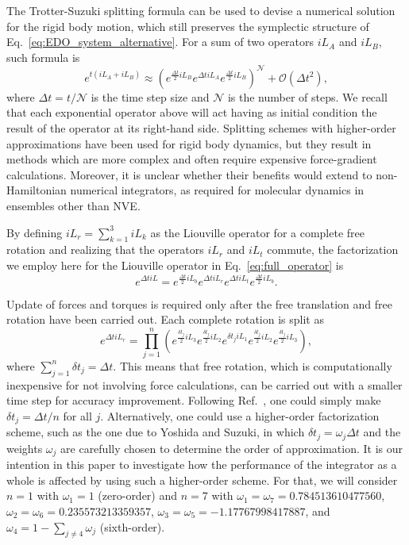 \documentclass[aip,jcp,reprint,amsmath,amssymb,raggedbottom]{revtex4-1}
\begin{document}
The Trotter-Suzuki splitting formula\cite{Trotter1959, Suzuki1976} can be used to devise a numerical solution for the rigid body motion, which still preserves the symplectic structure of Eq.~\ref{eq:EDO_system_alternative}. For a sum of two operators $i\!L_A$ and $i\!L_B$, such formula is
\[
e^{t(i\!L_A + i\!L_B)} \approx \left( e^{\frac{\Delta t}{2} i\!L_B} e^{\Delta t i\!L_A} e^{\frac{\Delta t}{2} i\!L_B} \right)^\mathcal{N} + \mathcal{O}(\Delta t^2),
\]
where $\Delta t = t/\mathcal N$ is the time step size and $\mathcal N$ is the number of steps. We recall that each exponential operator above will act having as initial condition the result of the operator at its right-hand side. Splitting schemes with higher-order approximations have been used for rigid body dynamics,\cite{Omelyan2007, Omelyan2008, vanZon2008} but they result in methods which are more complex and often require expensive force-gradient calculations. Moreover, it is unclear whether their benefits would extend to non-Hamiltonian numerical integrators, as required for molecular dynamics in ensembles other than NVE.

By defining $i\!L_r = \sum_{k=1}^3 i\!L_k$ as the Liouville operator for a complete free rotation and realizing that the operators $i\!L_r$ and $i\!L_t$ commute, the factorization we employ here for the Liouville operator in Eq.~\ref{eq:full_operator} is
\begin{equation}
\label{eq:trotter_splitting_NVE}
e^{\Delta t i\!L} = e^{\frac{\Delta t}{2} i\!L_b} e^{\Delta t i\!L_r} e^{\Delta t i\!L_t} e^{\frac{\Delta t}{2} i\!L_b}.
\end{equation}

Update of forces and torques is required only after the free translation and free rotation have been carried out. Each complete rotation is split as\cite{Miller2002}
\begin{equation}
\label{eq:splitting_rot}
e^{\Delta t i\!L_r} = \prod_{j=1}^n \left( e^{\frac{\delta t_j}{2} i\!L_3} e^{\frac{\delta t_j}{2} i\!L_2} e^{\delta t_j i\!L_1} e^{\frac{\delta t_j}{2} i\!L_2} e^{\frac{\delta t_j}{2} i\!L_3} \right),
\end{equation}
where $\sum_{j=1}^n {\delta t}_j = \Delta t$. This means that free rotation, which is computationally inexpensive for not involving force calculations, can be carried out with a smaller time step for accuracy improvement. Following Ref.~, one could simply make $\delta t_j = \Delta t/n$ for all $j$. Alternatively, one could use a higher-order factorization scheme, such as the one due to Yoshida\cite{Yoshida1990} and Suzuki,\cite{Suzuki1991a, Suzuki1991b} in which $\delta t_j = \omega_j \Delta t$ and the weights $\omega_j$ are carefully chosen to determine the order of approximation. It is our intention in this paper to investigate how the performance of the integrator as a whole is affected by using such a higher-order scheme. For that, we will consider $n = 1$ with $\omega_1 = 1$ (zero-order) and $n = 7$ with $\omega_1 = \omega_7 = 0.784513610477560$, $\omega_2 = \omega_6 = 0.235573213359357$, $\omega_3 = \omega_5 = -1.17767998417887$, and $\omega_4 = 1 - \sum_{j \neq 4} \omega_j$ (sixth-order).
\end{document}
